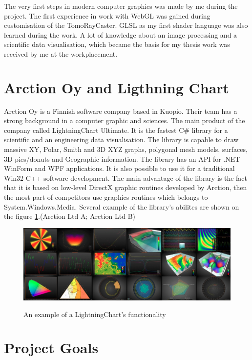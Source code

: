 \documentclass[twoside, english, 11pt]{report}
\begin{document}
The very first steps in modern computer graphics was made by me during the project. The first experience in work with WebGL was gained during customisation of the TomoRayCaster. GLSL as my first shader language was also learned during the work. A lot of knowledge about an image processing and a scientific data visualisation, which became the basis for my thesis work was received by me at the workplacement.


\section{Arction Oy and Ligthning Chart}

Arction Oy is a Finnish software company based in Kuopio. Their team has a strong background in a computer graphic and sciences. The main product of the company called LightningChart Ultimate. It is the fastest C\# library for a scientific and an engineering data visualisation. The library is capable to draw massive XY, Polar, Smith and 3D XYZ graphs, polygonal mesh models, surfaces, 3D pies/donuts and Geographic information. The library has an API for .NET WinForm and WPF applications. It is also possible to use it for a traditional Win32 C++ software development. The main advantage of the library is the fact that it is based on low-level DirectX graphic routines developed by Arction, then the most part of competitors use graphics routines which belongs to System.Windows.Media. Several example of the library's abilites are shown on the figure \ref{fig:lchu}.(Arction Ltd A; Arction Ltd B)\\
\begin{figure}[!h]
\includegraphics[scale=0.5]{img/lchu}\\
\caption{An example of a LightningChart's functionality\label{fig:lchu}}
\end{figure}


\section{Project Goals}
\end{document}
